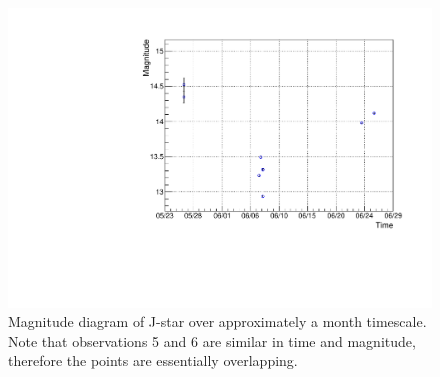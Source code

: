 \documentclass[onecolumn]{aastex6}
\begin{document}
\begin{figure}[h]
  \centering
  \includegraphics[scale=0.5]{magnitude.pdf}%
  \caption{Magnitude diagram of J-star over approximately a month timescale. Note that observations 5 and 6 are similar in time and magnitude, therefore the points are essentially overlapping.}
  \label{magnitudeplot}
\end{figure}
\end{document}
